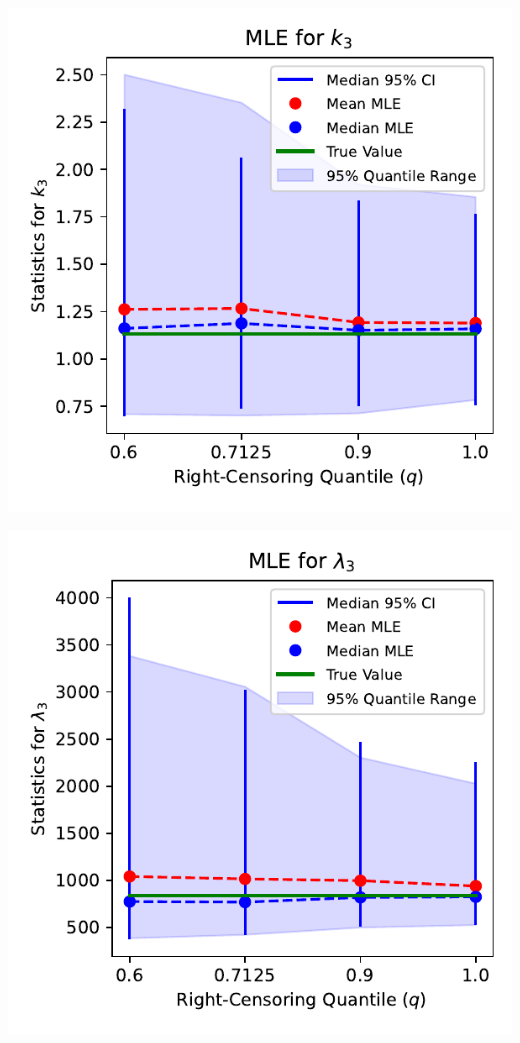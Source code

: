 \documentclass{article}
\begin{document}

\noindent
\begin{minipage}[t]{0.475\textwidth}
  \centering
  \includegraphics[width=\textwidth,height=0.33\textheight,keepaspectratio]{plot-q-vs-shape.3-mle.pdf}
\end{minipage}%
\begin{minipage}[t]{0.475\textwidth}
  \centering
  \includegraphics[width=\textwidth,height=0.33\textheight,keepaspectratio]{plot-q-vs-scale.3-mle.pdf}
\end{minipage}
\end{document}
